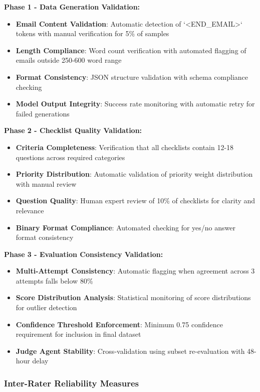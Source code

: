 \textbf{Phase 1 - Data Generation Validation:}
\begin{itemize}
    \item \textbf{Email Content Validation}: Automatic detection of `<END\_EMAIL>` tokens with manual verification for 5\% of samples
    \item \textbf{Length Compliance}: Word count verification with automated flagging of emails outside 250-600 word range
    \item \textbf{Format Consistency}: JSON structure validation with schema compliance checking
    \item \textbf{Model Output Integrity}: Success rate monitoring with automatic retry for failed generations
\end{itemize}

\textbf{Phase 2 - Checklist Quality Validation:}
\begin{itemize}
    \item \textbf{Criteria Completeness}: Verification that all checklists contain 12-18 questions across required categories
    \item \textbf{Priority Distribution}: Automatic validation of priority weight distribution with manual review
    \item \textbf{Question Quality}: Human expert review of 10\% of checklists for clarity and relevance
    \item \textbf{Binary Format Compliance}: Automated checking for yes/no answer format consistency
\end{itemize}

\textbf{Phase 3 - Evaluation Consistency Validation:}
\begin{itemize}
    \item \textbf{Multi-Attempt Consistency}: Automatic flagging when agreement across 3 attempts falls below 80\%
    \item \textbf{Score Distribution Analysis}: Statistical monitoring of score distributions for outlier detection
    \item \textbf{Confidence Threshold Enforcement}: Minimum 0.75 confidence requirement for inclusion in final dataset
    \item \textbf{Judge Agent Stability}: Cross-validation using subset re-evaluation with 48-hour delay
\end{itemize}

\subsubsection{Inter-Rater Reliability Measures}

